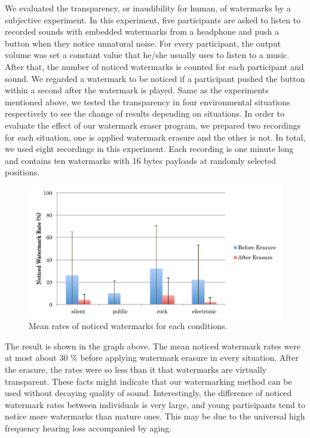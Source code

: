We evaluated the transparency, or inaudibility for human, of watermarks by a subjective experiment.
In this experiment, five participants are asked to listen to recorded sounds with embedded watermarks from a headphone and push a button when they notice unnatural noise.
For every participant, the output volume was set a constant value that he/she usually uses to listen to a music.
After that, the number of noticed watermarks is counted for each participant and sound.
We regarded a watermark to be noticed if a participant pushed the button within a second after the watermark is played.
Same as the experiments mentioned above, we tested the transparency in four environmental situations respectively to see the change of results depending on situations.
In order to evaluate the effect of our watermark eraser program, we prepared two recordings for each situation, one is applied watermark erasure and the other is not.
In total, we used eight recordings in this experiment.
Each recording is one minute long and contains ten watermarks with 16 bytes payloads at randomly selected positions.

\begin{figure}[htbp]
 \begin{center}
  \includegraphics[width=120mm]{evaluation_transparency.pdf}
 \end{center}
 \caption{Mean rates of noticed watermarks for each conditions.}
 \label{fig:eval_tran}
\end{figure}

The result is shown in the graph above.
The mean noticed watermark rates were at most about 30 \% before applying watermark erasure in every situation.
After the erasure, the rates were so less than it that watermarks are virtually transparent.
These facts might indicate that our watermarking method can be used without decaying quality of sound.
Interestingly, the difference of noticed watermark rates between individuals is very large, and young participants tend to notice more watermarks than mature ones.
This may be due to the universal high frequency hearing loss accompanied by aging.